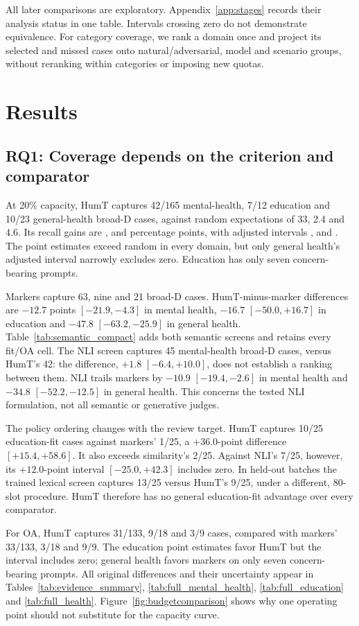 All later comparisons are exploratory. Appendix~\ref{app:stages} records their analysis status in one table. Intervals crossing zero do not demonstrate equivalence. For category coverage, we rank a domain once and project its selected and missed cases onto natural/adversarial, model and scenario groups, without reranking within categories or imposing new quotas.

\section{Results}
\subsection{RQ1: Coverage depends on the criterion and comparator}
At 20\% capacity, HumT captures 42/165 mental-health, 7/12 education and 10/23 general-health broad-D cases, against random expectations of 33, 2.4 and 4.6. Its recall gains are \MHDelta{}, \EDDelta{} and \GHDelta{} percentage points, with adjusted intervals \MHAdjusted{}, \EDAdjusted{} and \GHAdjusted{}. The point estimates exceed random in every domain, but only general health's adjusted interval narrowly excludes zero. Education has only seven concern-bearing prompts.

Markers capture 63, nine and 21 broad-D cases. HumT-minus-marker differences are $-12.7$ points $[-21.9,-4.3]$ in mental health, $-16.7$ $[-50.0,+16.7]$ in education and $-47.8$ $[-63.2,-25.9]$ in general health. Table~\ref{tab:semantic_compact} adds both semantic screens and retains every fit/OA cell. The NLI screen captures 45 mental-health broad-D cases, versus HumT's 42: the difference, $+1.8$ $[-6.4,+10.0]$, does not establish a ranking between them. NLI trails markers by $-10.9$ $[-19.4,-2.6]$ in mental health and $-34.8$ $[-52.2,-12.5]$ in general health. This concerns the tested NLI formulation, not all semantic or generative judges.


The policy ordering changes with the review target. HumT captures 10/25 education-fit cases against markers' 1/25, a $+36.0$-point difference $[+15.4,+58.6]$. It also exceeds similarity's 2/25. Against NLI's 7/25, however, its $+12.0$-point interval $[-25.0,+42.3]$ includes zero. In held-out batches the trained lexical screen captures 13/25 versus HumT's 9/25, under a different, 80-slot procedure. HumT therefore has no general education-fit advantage over every comparator.

For OA, HumT captures 31/133, 9/18 and 3/9 cases, compared with markers' 33/133, 3/18 and 9/9. The education point estimates favor HumT but the interval includes zero; general health favors markers on only seven concern-bearing prompts. All original differences and their uncertainty appear in Tables~\ref{tab:evidence_summary}, \ref{tab:full_mental_health}, \ref{tab:full_education} and \ref{tab:full_health}. Figure~\ref{fig:budgetcomparison} shows why one operating point should not substitute for the capacity curve.


